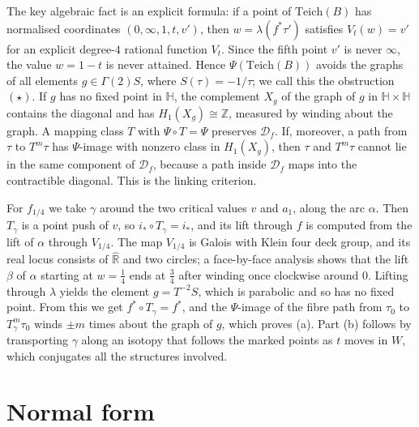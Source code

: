 \documentclass[11pt]{article}
\theoremstyle{definition}
\newcommand{\Teich}{\mathrm{Teich}}
\newcommand{\Rh}{\hat{\mathbb R}}
\newcommand{\HH}{\mathbb H}
\newcommand{\D}{\mathcal D}
\begin{document}
The key algebraic fact is an explicit formula: if a point of $\Teich(B)$ has normalised coordinates $(0,\infty,1,t,v')$, then $w=\lambda(f^*\tau')$ satisfies $V_t(w)=v'$ for an explicit degree-$4$ rational function $V_t$. Since the fifth point $v'$ is never $\infty$, the value $w=1-t$ is never attained. Hence $\Psi(\Teich(B))$ avoids the graphs of all elements $g\in\Gamma(2)S$, where $S(\tau)=-1/\tau$; we call this the obstruction~$(\star)$. If $g$ has no fixed point in $\HH$, the complement $X_g$ of the graph of $g$ in $\HH\times\HH$ contains the diagonal and has $H_1(X_g)\cong\mathbb Z$, measured by winding about the graph. A mapping class $T$ with $\Psi\circ T=\Psi$ preserves $\D_f$. If, moreover, a path from $\tau$ to $T^m\tau$ has $\Psi$-image with nonzero class in $H_1(X_g)$, then $\tau$ and $T^m\tau$ cannot lie in the same component of $\D_f$, because a path inside $\D_f$ maps into the contractible diagonal. This is the linking criterion.



For $f_{1/4}$ we take $\gamma$ around the two critical values $v$ and $a_1$, along the arc $\alpha$. Then $T_\gamma$ is a point push of $v$, so $i_*\circ T_\gamma=i_*$, and its lift through $f$ is computed from the lift of $\alpha$ through $V_{1/4}$. The map $V_{1/4}$ is Galois with Klein four deck group, and its real locus consists of $\Rh$ and two circles; a face-by-face analysis shows that the lift $\beta$ of $\alpha$ starting at $w=\tfrac14$ ends at $\tfrac34$ after winding once clockwise around $0$. Lifting through $\lambda$ yields the element $g=T^{-2}S$, which is parabolic and so has no fixed point. From this we get $f^*\circ T_\gamma=f^*$, and the $\Psi$-image of the fibre path from $\tau_0$ to $T_\gamma^m\tau_0$ winds $\pm m$ times about the graph of $g$, which proves (a). Part (b) follows by transporting $\gamma$ along an isotopy that follows the marked points as $t$ moves in $W$, which conjugates all the structures involved.

\section{Normal form}\label{sec:normal}
\end{document}

